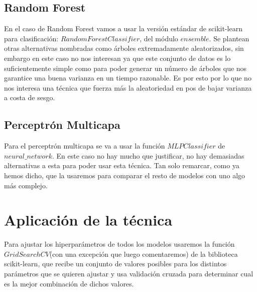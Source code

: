 \documentclass{article}
\begin{document}
	\subsection{Random Forest}
	En el caso de Random Forest vamos a usar la versión estándar de scikit-learn para clasificación: $RandomForestClassifier$, del módulo $ensemble$. Se plantean otras alternativas nombradas como árboles extremadamente aleatorizados, sin embargo en este caso no nos interesan ya que este conjunto de datos es lo suficientemente simple como para poder generar un número de árboles que nos garantice una buena varianza en un tiempo razonable. Es por esto por lo que no nos interesa una técnica que fuerza más la aleatoriedad en pos de bajar varianza a costa de sesgo.
	\subsection{Perceptrón Multicapa}
	Para el perceptrón multicapa se va a usar la función $MLPClassifier$ de $neural\_network$. En este caso no hay mucho que justificar, no hay demasiadas alternativas a esta para poder usar esta técnica. Tan solo remarcar, como ya hemos dicho, que la usaremos para comparar el resto de modelos con uno algo más complejo.
	
	\section{Aplicación de la técnica}
	
	Para ajustar los hiperparámetros de todos los modelos usaremos la función $GridSearchCV$(con una excepción que luego comentaremos) de la biblioteca scikit-learn, que recibe un conjunto de valores posibles para los distintos parámetros que se quieren ajustar y usa validación cruzada para determinar cual es la mejor combinación de dichos valores.
\end{document}
